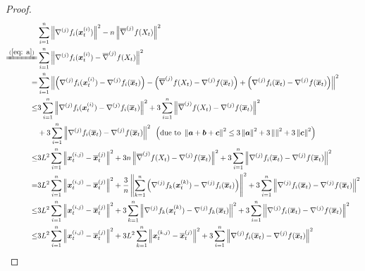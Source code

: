 \begin{lemma}
\begin{proof}
\begin{align*}
&\sum_{i=1}^n\left\|\nabla^{(j)} f_i(\bm{x}_t^{(i)})\right\|^2  - n\left\| \overline{\nabla}^{(j)}f(X_t) \right\|^2\\
\xlongequal{(\ref{eq: a})} & \sum_{i=1}^n\left\|\nabla^{(j)} f_i(\bm{x}_t^{(i)}) - \overline{\nabla}^{(j)}f(X_t) \right\|^2\\
= &  \sum_{i=1}^n\left\|\left(\nabla^{(j)} f_i(\bm{x}_t^{(i)}) - \nabla^{(j)} f_i(\overline{\bm{x}}_t)\right) - \left(\overline{\nabla}^{(j)}f(X_t) - \nabla^{(j)} f(\overline{\bm{x}}_t)\right) + \left(\nabla^{(j)} f_i(\overline{\bm{x}}_t) - \nabla^{(j)} f(\overline{\bm{x}}_t)\right) \right\|^2\\
\leq &  3\sum_{i=1}^n\left\|\nabla^{(j)} f_i(\bm{x}_t^{(i)}) - \nabla^{(j)} f_i(\overline{\bm{x}}_t)\right\|^2 + 3\sum_{i=1}^n\left\| \overline{\nabla}^{(j)}f(X_t) - \nabla^{(j)} f(\overline{\bm{x}}_t)\right\|^2 \\
& + 3\sum_{i=1}^n\left\| \nabla^{(j)} f_i(\overline{\bm{x}}_t) - \nabla^{(j)} f(\overline{\bm{x}}_t) \right\|^2 \text{        }\left(\text{due to } \left\|\bm{a} + \bm{b} + \bm{c}\right\|^2\le 3\left\|\bm{a}\right\|^2 + 3\left\|\bm{}\right\|^2 + 3\left\|\bm{c}\right\|^2\right)\\
\leq &  3L^2\sum_{i=1}^n\left\|\bm{x}_t^{(i,j)} - \overline{\bm{x}}_t^{(j)}\right\|^2  + 3n\left\| \overline{\nabla}^{(j)}f(X_t) - \nabla^{(j)} f(\overline{\bm{x}}_t)\right\|^2+ 3\sum_{i=1}^n\left\| \nabla^{(j)} f_i(\overline{\bm{x}}_t) - \nabla^{(j)} f(\overline{\bm{x}}_t) \right\|^2\\
= &  3L^2\sum_{i=1}^n\left\|\bm{x}_t^{(i,j)} - \overline{\bm{x}}_t^{(j)}\right\|^2  + \frac{3}{n}\left\|\sum_{k=1}^n \left( \nabla^{(j)} f_k(\bm{x}_t^{(k)}) - \nabla^{(j)} f_i(\overline{\bm{x}}_t) \right)\right\|^2+ 3\sum_{i=1}^n\left\| \nabla^{(j)} f_i(\overline{\bm{x}}_t) - \nabla^{(j)} f(\overline{\bm{x}}_t) \right\|^2\\
\leq &  3L^2\sum_{i=1}^n\left\|\bm{x}_t^{(i,j)} - \overline{\bm{x}}_t^{(j)}\right\|^2  + 3\sum_{k=1}^n \left\| \nabla^{(j)} f_k(\bm{x}_t^{(k)}) - \nabla^{(j)} f_k(\overline{\bm{x}}_t)\right\|^2+ 3\sum_{i=1}^n\left\| \nabla^{(j)} f_i(\overline{\bm{x}}_t) - \nabla^{(j)} f(\overline{\bm{x}}_t) \right\|^2\\
\leq &  3L^2\sum_{i=1}^n\left\|\bm{x}_t^{(i,j)} - \overline{\bm{x}}_t^{(j)}\right\|^2  + 3L^2\sum_{k=1}^n\left\|\bm{x}_t^{(k,j)} - \overline{\bm{x}}_t^{(j)}\right\|^2+ 3\sum_{i=1}^n\left\| \nabla^{(j)} f_i(\overline{\bm{x}}_t) - \nabla^{(j)} f(\overline{\bm{x}}_t) \right\|^2\\

\end{align*}
\end{proof}
\end{lemma}

